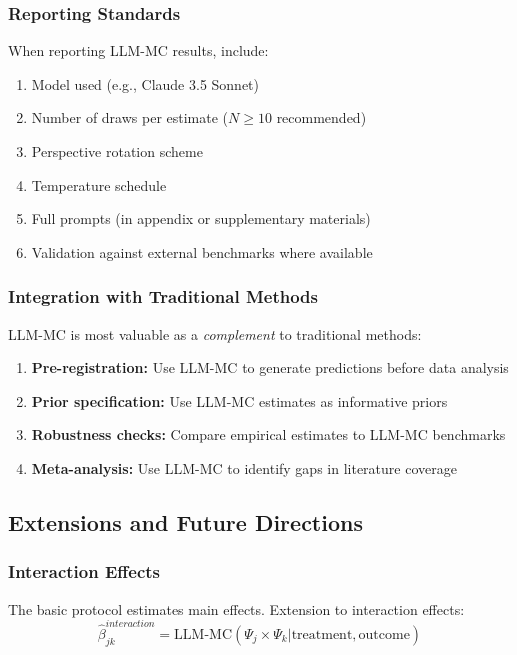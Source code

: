 \subsubsection{Reporting Standards}

When reporting LLM-MC results, include:
\begin{enumerate}
    \item Model used (e.g., Claude 3.5 Sonnet)
    \item Number of draws per estimate ($N \geq 10$ recommended)
    \item Perspective rotation scheme
    \item Temperature schedule
    \item Full prompts (in appendix or supplementary materials)
    \item Validation against external benchmarks where available
\end{enumerate}

\subsubsection{Integration with Traditional Methods}

LLM-MC is most valuable as a \textit{complement} to traditional methods:

\begin{enumerate}
    \item \textbf{Pre-registration:} Use LLM-MC to generate predictions before data analysis
    \item \textbf{Prior specification:} Use LLM-MC estimates as informative priors
    \item \textbf{Robustness checks:} Compare empirical estimates to LLM-MC benchmarks
    \item \textbf{Meta-analysis:} Use LLM-MC to identify gaps in literature coverage
\end{enumerate}

\subsection{Extensions and Future Directions}

\subsubsection{Interaction Effects}

The basic protocol estimates main effects. Extension to interaction effects:
\begin{equation}
\hat{\beta}_{jk}^{interaction} = \text{LLM-MC}(\Psi_j \times \Psi_k | \text{treatment}, \text{outcome})
\end{equation}

